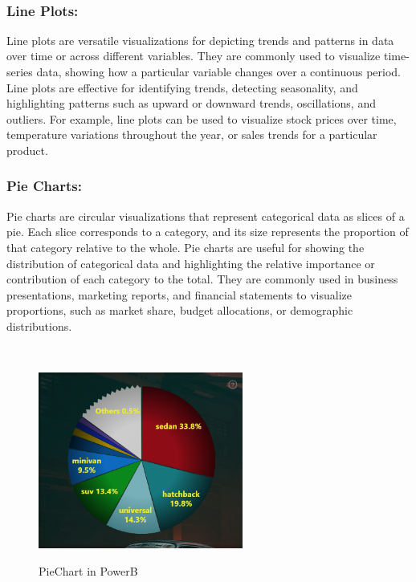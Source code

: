 \documentclass{article}
\begin{document}
{\\
\subsubsection{Line Plots:}
Line plots are versatile visualizations for depicting trends and patterns in data over time or across different variables. They are commonly used to visualize time-series data, showing how a particular variable changes over a continuous period. Line plots are effective for identifying trends, detecting seasonality, and highlighting patterns such as upward or downward trends, oscillations, and outliers. For example, line plots can be used to visualize stock prices over time, temperature variations throughout the year, or sales trends for a particular product.

\subsubsection{Pie Charts:}
Pie charts are circular visualizations that represent categorical data as slices of a pie. Each slice corresponds to a category, and its size represents the proportion of that category relative to the whole. Pie charts are useful for showing the distribution of categorical data and highlighting the relative importance or contribution of each category to the total. They are commonly used in business presentations, marketing reports, and financial statements to visualize proportions, such as market share, budget allocations, or demographic distributions.

\\
\begin{figure}[htbp]
  \centering
  \vspace{0.3cm}
  \includegraphics[width=0.6\textwidth]{Figures/PowerBI/piechart.png}\\
  \caption{PieChart in PowerB}
  \vspace{0.3cm}
\end{figure}
\\
\newpage
}
\end{document}
